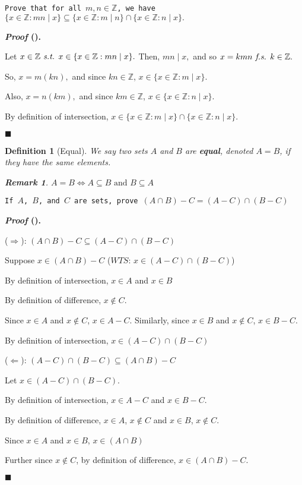 \documentclass[12pt,a4paper]{article}
\newcounter{nprf}[subsection]
\newtheorem{df}{Definition}[subsection]
\newtheorem*{rmk}{\indent Remark}
\newenvironment*{prf}{\par\indent\textbf{\textit{Proof} (\stepcounter{nprf}\thenprf). }\par}{\par\hfill $\blacksquare$\par}
\def\Z{{\mathbb{Z}}}
\def\st{\emph{ s.t. }}
\def\fs{\emph{ f.s. }}
\def\WTS{\mathit{WTS}}
\begin{document}
\begin{framed}
\noindent\texttt{Prove that for all $m,n\in\Z$, we have $\{x\in\Z: mn\mid x\}\subseteq\{x\in\Z:m\mid n\}\cap\{x\in\Z:n\mid x\}.$}	
\begin{prf}
	Let $x\in\Z\st x\in\{x\in\Z: mn\mid x\}.$ Then, $mn\mid x,$ and so $x=kmn\fs k\in\Z.$\par So, $x=m(kn),$ and since $kn\in\Z$, $x\in\{x\in\Z:m\mid x\}$.\par Also, $x=n(km),$ and since $km\in\Z$, $x\in\{x\in\Z:n\mid x\}$.\par By definition of intersection, $x\in\{x\in\Z:m\mid x\}\cap\{x\in\Z:n\mid x\}$.
\end{prf}
\end{framed}
\begin{df}[Equal]
	We say two sets $A$ and $B$ are \textbf{equal}, denoted $A=B$, if they have the same elements.
	\begin{rmk}
		$A=B\iff A\subseteq B\text{ and }B\subseteq A$	
	\end{rmk}
\end{df}
\begin{framed}
\noindent\texttt{If $A$, $B$, and $C$ are sets, prove $(A\cap B)-C=(A-C)\cap(B-C)$}
\begin{prf}
	($\Rightarrow$): $(A\cap B)-C\subseteq(A-C)\cap(B-C)$\par Suppose $x\in(A\cap B)-C$ ($\WTS$: $x\in(A-C)\cap(B-C)$)\par By definition of intersection, $x\in A$ and $x\in B$\par By definition of difference, $x\notin C.$\par Since $x\in A$ and $x\notin C$, $x\in A-C$. Similarly, since $x\in B$ and $x\notin C$, $x\in B-C$.\par By definition of intersection, $x\in(A-C)\cap(B-C)$\par
	($\Leftarrow$): $(A-C)\cap(B-C)\subseteq(A\cap B)-C$\par Let $x\in(A-C)\cap(B-C)$.\par By definition of intersection, $x\in A-C$ and $x\in B-C$.\par By definition of difference, $x\in A$, $x\notin C$ and $x\in B$, $x\notin C$.\par Since $x\in A$ and $x\in B$, $x\in(A\cap B)$\par Further since $x\notin C$, by definition of difference, $x\in(A\cap B)-C.$
\end{prf}
\end{framed}
\end{document}

